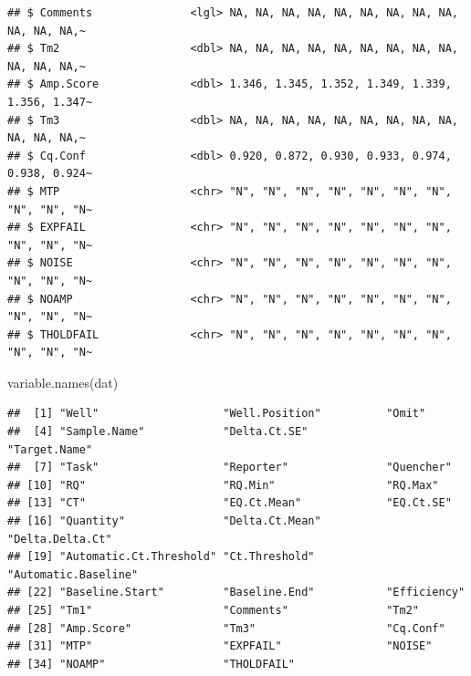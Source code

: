 \documentclass[
]{book}
\newenvironment{Shaded}{\begin{snugshade}}{\end{snugshade}}
\newcommand{\FunctionTok}[1]{\textcolor[rgb]{0.00,0.00,0.00}{#1}}
\newcommand{\NormalTok}[1]{#1}
\newcommand{\SpecialCharTok}[1]{\textcolor[rgb]{0.00,0.00,0.00}{#1}}
\begin{document}
\begin{verbatim}
## $ Comments               <lgl> NA, NA, NA, NA, NA, NA, NA, NA, NA, NA, NA, NA,~
## $ Tm2                    <dbl> NA, NA, NA, NA, NA, NA, NA, NA, NA, NA, NA, NA,~
## $ Amp.Score              <dbl> 1.346, 1.345, 1.352, 1.349, 1.339, 1.356, 1.347~
## $ Tm3                    <dbl> NA, NA, NA, NA, NA, NA, NA, NA, NA, NA, NA, NA,~
## $ Cq.Conf                <dbl> 0.920, 0.872, 0.930, 0.933, 0.974, 0.938, 0.924~
## $ MTP                    <chr> "N", "N", "N", "N", "N", "N", "N", "N", "N", "N~
## $ EXPFAIL                <chr> "N", "N", "N", "N", "N", "N", "N", "N", "N", "N~
## $ NOISE                  <chr> "N", "N", "N", "N", "N", "N", "N", "N", "N", "N~
## $ NOAMP                  <chr> "N", "N", "N", "N", "N", "N", "N", "N", "N", "N~
## $ THOLDFAIL              <chr> "N", "N", "N", "N", "N", "N", "N", "N", "N", "N~
\end{verbatim}

\begin{Shaded}
\begin{Highlighting}[]
\FunctionTok{variable.names}\NormalTok{(dat)}
\end{Highlighting}
\end{Shaded}

\begin{verbatim}
##  [1] "Well"                   "Well.Position"          "Omit"                  
##  [4] "Sample.Name"            "Delta.Ct.SE"            "Target.Name"           
##  [7] "Task"                   "Reporter"               "Quencher"              
## [10] "RQ"                     "RQ.Min"                 "RQ.Max"                
## [13] "CT"                     "EQ.Ct.Mean"             "EQ.Ct.SE"              
## [16] "Quantity"               "Delta.Ct.Mean"          "Delta.Delta.Ct"        
## [19] "Automatic.Ct.Threshold" "Ct.Threshold"           "Automatic.Baseline"    
## [22] "Baseline.Start"         "Baseline.End"           "Efficiency"            
## [25] "Tm1"                    "Comments"               "Tm2"                   
## [28] "Amp.Score"              "Tm3"                    "Cq.Conf"               
## [31] "MTP"                    "EXPFAIL"                "NOISE"                 
## [34] "NOAMP"                  "THOLDFAIL"
\end{verbatim}

\begin{Shaded}
\end{Shaded}
\end{document}
